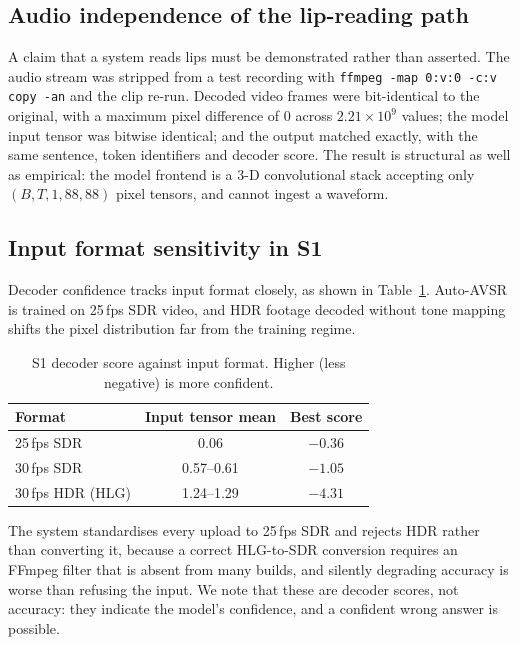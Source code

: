 \documentclass[conference]{IEEEtran}
\begin{document}
\subsection{Audio independence of the lip-reading path}

A claim that a system reads lips must be demonstrated rather than asserted. The
audio stream was stripped from a test recording with
\texttt{ffmpeg -map 0:v:0 -c:v copy -an} and the clip re-run. Decoded video
frames were bit-identical to the original, with a maximum pixel difference of 0
across $2.21 \times 10^{9}$ values; the model input tensor was bitwise identical;
and the output matched exactly, with the same sentence, token identifiers and
decoder score. The result is structural as well as empirical: the model frontend
is a 3-D convolutional stack accepting only $(B, T, 1, 88, 88)$ pixel tensors,
and cannot ingest a waveform.

\subsection{Input format sensitivity in S1}

Decoder confidence tracks input format closely, as shown in
Table~\ref{tab:format}. Auto-AVSR is trained on 25\,fps SDR video, and HDR
footage decoded without tone mapping shifts the pixel distribution far from the
training regime.

\begin{table}[t]
\caption{S1 decoder score against input format. Higher (less negative) is more
confident.}
\label{tab:format}
\centering
\small
\begin{tabular}{@{}lcc@{}}
\toprule
\textbf{Format} & \textbf{Input tensor mean} & \textbf{Best score} \\
\midrule
25\,fps SDR & 0.06 & $-0.36$ \\
30\,fps SDR & 0.57--0.61 & $-1.05$ \\
30\,fps HDR (HLG) & 1.24--1.29 & $-4.31$ \\
\bottomrule
\end{tabular}
\end{table}

The system standardises every upload to 25\,fps SDR and rejects HDR rather than
converting it, because a correct HLG-to-SDR conversion requires an FFmpeg filter
that is absent from many builds, and silently degrading accuracy is worse than
refusing the input. We note that these are decoder scores, not accuracy: they
indicate the model's confidence, and a confident wrong answer is possible.
\end{document}

